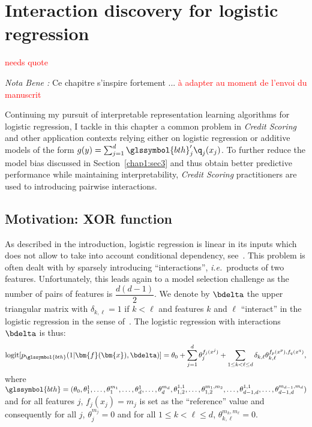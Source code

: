 \chapter{Interaction discovery for logistic regression} \label{chap5}

\minitoc


\textcolor{red}{needs quote}

\textit{Nota Bene :} Ce chapitre s'inspire fortement ... \textcolor{red}{à adapter au moment de l'envoi du manuscrit}


Continuing my pursuit of interpretable representation learning algorithms for logistic regression, I tackle in this chapter a common problem in \textit{Credit Scoring} and other application contexts relying either on logistic regression or additive models of the form $g(y) = \sum_{j=1}^d \glssymbol{bth}_j' \q_j(x_j)$. To further reduce the model bias discussed in Section~\ref{chap1:sec3} and thus obtain better predictive performance while maintaining interpretability, \textit{Credit Scoring} practitioners are used to introducing pairwise interactions.


\section{Motivation: XOR function}

As described in the introduction, logistic regression is linear in its inputs which does not allow to take into account conditional dependency, see~\cite{berry2010testing}. This problem is often dealt with by sparsely introducing ``interactions'', \textit{i.e.}\ products of two features. Unfortunately, this leads again to a model selection challenge as the number of pairs of features is $\dfrac{d(d-1)}{2}$. We denote by $\bdelta$ the upper triangular matrix with $\delta_{k,\ell} = 1$ if $k < \ell$ and features $k$ and $\ell$ ``interact'' in the logistic regression in the sense of~\cite{berry2010testing}. The logistic regression with interactions $\bdelta$ is thus:
\begin{equation} \label{eq:reglog_sans}
\text{logit}[p_{\glssymbol{bth}}(1|\bm{f}(\bm{x}),\bdelta)] = \theta_{0} + \sum_{j=1}^d \theta_{j}^{f_j(x^j)} + \sum_{1 \leq k < \ell \leq d} \delta_{k,\ell} \theta_{k,\ell}^{f_p(x^p),f_q(x^q)},
\end{equation}
where $\glssymbol{bth} = (\theta_{0},\theta_{1}^1,\dots,\theta_{1}^{m_1},\dots,\theta_{d}^1,\dots,\theta_{d}^{m_d},\theta_{1,2}^{1,1},\dots,\theta_{1,2}^{m_1,m_2},\dots,\theta_{d-1,d}^{1,1},\dots,\theta_{d-1,d}^{m_{d-1},m_d})$ and for all features $j$, $f_j(x_j)=m_j$ is set as the ``reference'' value and consequently for all $j$, $\theta_{j}^{m_j}=0$ and for all $1 \leq k < \ell \leq d$, $\theta_{k,\ell}^{m_k,m_{\ell}}=0$.


